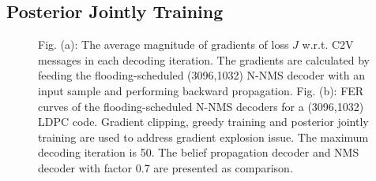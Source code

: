 \documentclass [PhD] {uclathes}
\begin{document}
\subsection{Posterior Jointly Training}\label{Sec: gradient_explosion}
\begin{figure}[t] 
    \centering
    \hfill
  \caption{Fig. (a): The average magnitude of gradients of loss $J$ w.r.t. C2V messages in each decoding iteration. The gradients are calculated by feeding the flooding-scheduled (3096,1032) N-NMS decoder with an input sample and performing backward propagation. Fig. (b): FER curves of the flooding-scheduled N-NMS decoders for a (3096,1032) LDPC code.  Gradient clipping, greedy training and posterior jointly training are used to address gradient explosion issue. The maximum decoding iteration is 50. The belief propagation decoder and NMS decoder with factor 0.7 are presented as comparison.}
\end{figure}
\end{document}
